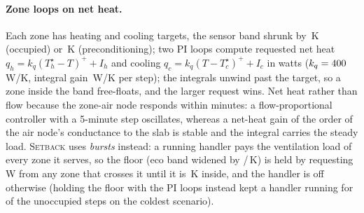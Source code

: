 \documentclass{article}
\begin{document}
\paragraph{Zone loops on net heat.}
Each zone has heating and cooling targets, the sensor band shrunk by \ParMarginOcc\,K
(occupied) or \ParMarginPre\,K (preconditioning); two PI loops compute requested net heat
$q_h = k_q (T_h^\star - T)^+ + I_h$ and cooling $q_c = k_q (T - T_c^\star)^+ + I_c$ in watts
($k_q = 400$\,W/K, integral gain \ParKiWPerKStep\,W/K per step); the integrals unwind
past the target, so a zone inside the band free-floats, and the larger request wins. Net
heat rather than flow because the zone-air node responds within minutes: a flow-proportional
controller with a 5-minute step oscillates, whereas a net-heat gain of the order of the air
node's conductance to the slab is stable and the integral carries the steady load.
\textsc{Setback} uses \emph{bursts} instead: a running handler pays the ventilation load of
every zone it serves, so the floor (eco band widened by \ParNightLowExt{}/\ParNightHighExt\,K)
is held by requesting \ParQSbW\,W from any zone that crosses it until it is \ParSbHystK\,K
inside, and the handler is off otherwise (holding the floor with the PI loops instead kept a
handler running for \VthreeAhuOnUnocc{} of the unoccupied steps on the coldest scenario).
\end{document}
